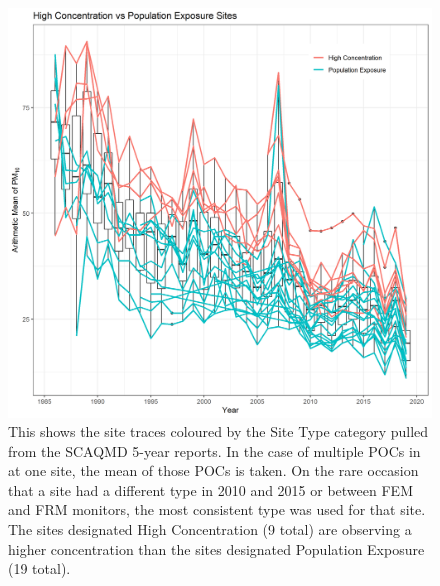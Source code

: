 \begin{figure}[ht]
\centering
\includegraphics[width = \textwidth]{Figures/SOCAB_metadata_Site_Type.png}
\caption{This shows the site traces coloured by the Site Type category pulled from the \ac{SCAQMD} 5-year reports.  In the case of multiple \ac{POC}s in at one site, the mean of those \ac{POC}s is taken.  On the rare occasion that a site had a different type in 2010 and 2015 or between \ac{FEM} and \ac{FRM} monitors, the most consistent type was used for that site.  The sites designated High Concentration (9 total) are observing a higher concentration than the sites designated Population Exposure (19 total).  }
\label{fig:SOCAB_metadata_Site_Type}
\end{figure}

